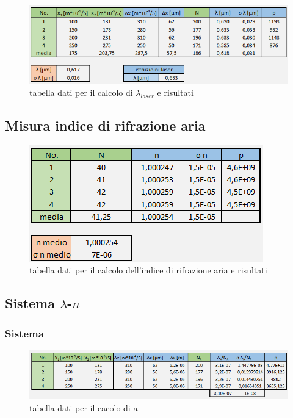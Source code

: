 \documentclass{article}
\begin{document}
\begin{figure}[h!]
  \centering
  \includegraphics[width=1\linewidth]{IM tabella lambda}
  \caption{tabella dati per il calcolo di $\lambda_{laser}$ e risultati}
\end{figure}

\subsection{Misura indice di rifrazione aria}

\begin{figure}[h!]
  \centering
  \includegraphics[width=0.6\linewidth]{IM tabella n}
  \caption{tabella dati per il calcolo dell'indice di rifrazione aria e risultati}
\end{figure}

\subsection{Sistema $\lambda$-$n$}
\subsubsection{Sistema}

\begin{figure}[h!]
  \centering
  \includegraphics[width=1\linewidth]{IM tabella a}
  \caption{tabella dati per il cacolo di a}
\end{figure}
\end{document}
